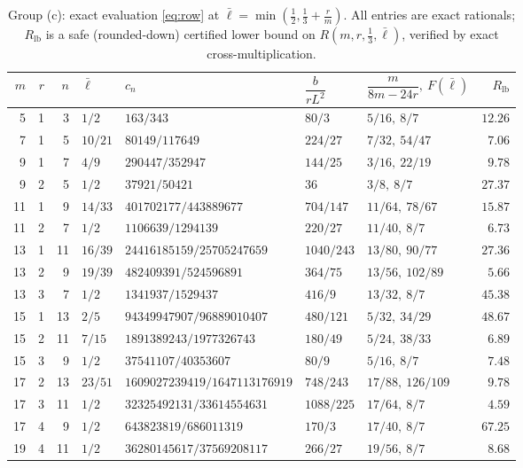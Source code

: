 \documentclass[11pt]{article}
\theoremstyle{remark}
\theoremstyle{plain}
\theoremstyle{plain}
\newcommand{\lbar}{\bar\ell}
\begin{document}
\begin{table}[ht]
\caption{Group (c): exact evaluation \eqref{eq:row} at $\lbar=\min(\tfrac12,\tfrac13+\tfrac rm)$.  All entries are exact rationals; $R_{\mathrm{lb}}$ is a safe (rounded-down) certified lower bound on $R(m,r,\tfrac13,\lbar)$, verified by exact cross-multiplication.}
\label{tab:pairs}
\centering
\footnotesize
\setlength{\tabcolsep}{4pt}
\begin{tabular}{@{}rrrllllr@{}}
\toprule
$m$ & $r$ & $n$ & $\lbar$ & $c_n$ & $\dfrac b{rL^2}$ & $\dfrac m{8m-24r},\ F(\lbar)$ & $R_{\mathrm{lb}}$\\
\midrule
 5&1& 3&$1/2$  &$163/343$                        &$80/3$   &$5/16,\ 8/7$    &$12.26$\\
 7&1& 5&$10/21$&$80149/117649$                   &$224/27$ &$7/32,\ 54/47$  &$7.06$\\
 9&1& 7&$4/9$  &$290447/352947$                  &$144/25$ &$3/16,\ 22/19$  &$9.78$\\
 9&2& 5&$1/2$  &$37921/50421$                    &$36$     &$3/8,\ 8/7$     &$27.37$\\
11&1& 9&$14/33$&$401702177/443889677$            &$704/147$&$11/64,\ 78/67$ &$15.87$\\
11&2& 7&$1/2$  &$1106639/1294139$                &$220/27$ &$11/40,\ 8/7$   &$6.73$\\
13&1&11&$16/39$&$24416185159/25705247659$        &$1040/243$&$13/80,\ 90/77$&$27.36$\\
13&2& 9&$19/39$&$482409391/524596891$            &$364/75$ &$13/56,\ 102/89$&$5.66$\\
13&3& 7&$1/2$  &$1341937/1529437$                &$416/9$  &$13/32,\ 8/7$   &$45.38$\\
15&1&13&$2/5$  &$94349947907/96889010407$        &$480/121$&$5/32,\ 34/29$  &$48.67$\\
15&2&11&$7/15$ &$1891389243/1977326743$          &$180/49$ &$5/24,\ 38/33$  &$6.89$\\
15&3& 9&$1/2$  &$37541107/40353607$              &$80/9$   &$5/16,\ 8/7$    &$7.48$\\
17&2&13&$23/51$&$1609027239419/1647113176919$    &$748/243$&$17/88,\ 126/109$&$9.78$\\
17&3&11&$1/2$  &$32325492131/33614554631$        &$1088/225$&$17/64,\ 8/7$  &$4.59$\\
17&4& 9&$1/2$  &$643823819/686011319$            &$170/3$  &$17/40,\ 8/7$   &$67.25$\\
19&4&11&$1/2$  &$36280145617/37569208117$        &$266/27$ &$19/56,\ 8/7$   &$8.68$\\

\end{tabular}
\end{table}
\end{document}
